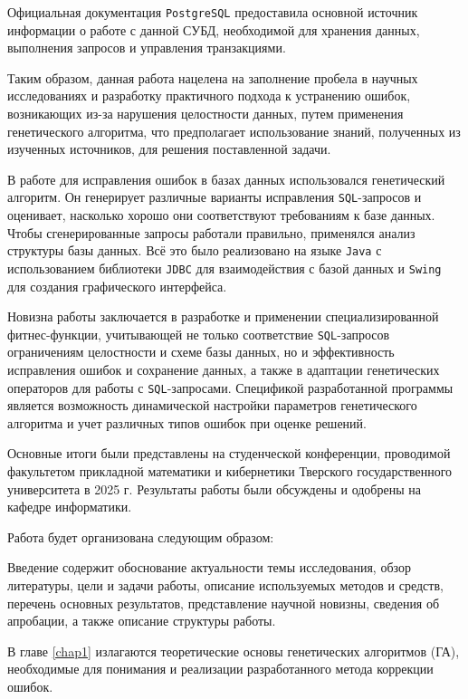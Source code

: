 \documentclass[master,paper]{pmk-graduate}
\begin{document}
Официальная документация \texttt{PostgreSQL} \cite{bib8} предоставила основной источник информации о работе с данной СУБД, необходимой для хранения данных, выполнения запросов и управления транзакциями.

Таким образом, данная работа нацелена на заполнение пробела в научных исследованиях и разработку практичного подхода к устранению ошибок, возникающих из-за нарушения целостности данных, путем применения генетического алгоритма, что предполагает использование знаний, полученных из изученных источников, для решения поставленной задачи.

\goalandtasks

\tools
В работе для исправления ошибок в базах данных использовался генетический алгоритм. Он генерирует различные варианты исправления \texttt{SQL}-запросов и оценивает, насколько хорошо они соответствуют требованиям к базе данных. Чтобы сгенерированные запросы работали правильно, применялся анализ структуры базы данных. Всё это было реализовано на языке \texttt{Java} с использованием библиотеки \texttt{JDBC} для взаимодействия с базой данных и \texttt{Swing} для создания графического интерфейса.

\results

\originality
Новизна работы заключается в разработке и применении специализированной фитнес-функции, учитывающей не только соответствие \texttt{SQL}-запросов ограничениям целостности и схеме базы данных, но и эффективность исправления ошибок и сохранение данных, а также в адаптации генетических операторов для работы с \texttt{SQL}-запросами. Спецификой разработанной прог\-раммы является возможность динамической настройки параметров генетического алгоритма и учет различных типов ошибок при оценке решений.

\approbation
Основные итоги были представлены на студенческой конференции, проводимой факультетом прикладной математики и кибернетики Тверского государственного университета в 2025 г. Результаты работы были обсуждены и одобрены на кафедре информатики.

\structure
Работа будет организована следующим образом:

Введение содержит обоснование актуальности темы исследования, обзор литературы, цели и задачи работы, описание используемых методов и средств, перечень основных результатов, представление научной новизны, сведения об апробации, а также описание структуры работы.

В главе \ref{chap1} излагаются теоретические основы генетических алгоритмов (ГА), необходимые для понимания и реализации разработанного метода коррекции ошибок.
\end{document}
